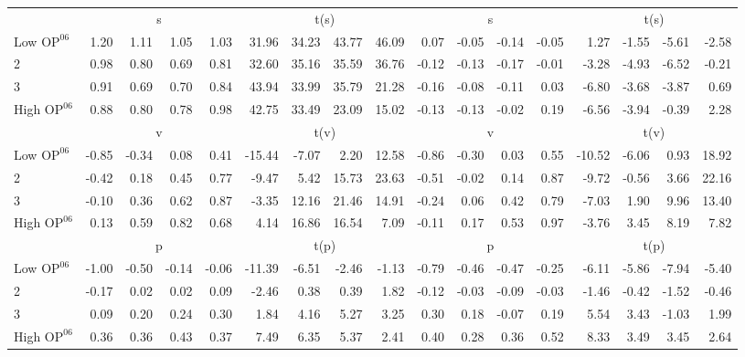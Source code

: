 \begin{table}[!ht]
\begin{tabular}{lrrrrrrrrrrrrrrrr}
  
     & \multicolumn{4}{c}{s} & \multicolumn{4}{c}{t(s)}  & \multicolumn{4}{c}{s} & \multicolumn{4}{c}{t(s)}   \\
     \cmidrule(r){2-5} \cmidrule(r){6-9}  \cmidrule(r){10-13} \cmidrule(r){14-17} 
    Low $\text{OP}^{06}$  & 1.20  & 1.11  & 1.05  & 1.03  & 31.96  & 34.23  & 43.77  & 46.09  & 0.07  & -0.05  & -0.14  & -0.05  & 1.27  & -1.55  & -5.61  & -2.58   \\
    2  & 0.98  & 0.80  & 0.69  & 0.81  & 32.60  & 35.16  & 35.59  & 36.76  & -0.12  & -0.13  & -0.17  & -0.01  & -3.28  & -4.93  & -6.52  & -0.21   \\
    3  & 0.91  & 0.69  & 0.70  & 0.84  & 43.94  & 33.99  & 35.79  & 21.28  & -0.16  & -0.08  & -0.11  & 0.03  & -6.80  & -3.68  & -3.87  & 0.69   \\
    High $\text{OP}^{06}$  & 0.88  & 0.80  & 0.78  & 0.98  & 42.75  & 33.49  & 23.09  & 15.02  & -0.13  & -0.13  & -0.02  & 0.19  & -6.56  & -3.94  & -0.39  & 2.28   \\
    
  
     & \multicolumn{4}{c}{v} & \multicolumn{4}{c}{t(v)}  & \multicolumn{4}{c}{v} & \multicolumn{4}{c}{t(v)}   \\
     \cmidrule(r){2-5} \cmidrule(r){6-9}  \cmidrule(r){10-13} \cmidrule(r){14-17} 
    Low $\text{OP}^{06}$  & -0.85  & -0.34  & 0.08  & 0.41  & -15.44  & -7.07  & 2.20  & 12.58  & -0.86  & -0.30  & 0.03  & 0.55  & -10.52  & -6.06  & 0.93  & 18.92   \\
    2  & -0.42  & 0.18  & 0.45  & 0.77  & -9.47  & 5.42  & 15.73  & 23.63  & -0.51  & -0.02  & 0.14  & 0.87  & -9.72  & -0.56  & 3.66  & 22.16   \\
    3  & -0.10  & 0.36  & 0.62  & 0.87  & -3.35  & 12.16  & 21.46  & 14.91  & -0.24  & 0.06  & 0.42  & 0.79  & -7.03  & 1.90  & 9.96  & 13.40   \\
    High $\text{OP}^{06}$  & 0.13  & 0.59  & 0.82  & 0.68  & 4.14  & 16.86  & 16.54  & 7.09  & -0.11  & 0.17  & 0.53  & 0.97  & -3.76  & 3.45  & 8.19  & 7.82   \\
    
  
     & \multicolumn{4}{c}{p} & \multicolumn{4}{c}{t(p)}  & \multicolumn{4}{c}{p} & \multicolumn{4}{c}{t(p)}   \\
     \cmidrule(r){2-5} \cmidrule(r){6-9}  \cmidrule(r){10-13} \cmidrule(r){14-17} 
    Low $\text{OP}^{06}$  & -1.00  & -0.50  & -0.14  & -0.06  & -11.39  & -6.51  & -2.46  & -1.13  & -0.79  & -0.46  & -0.47  & -0.25  & -6.11  & -5.86  & -7.94  & -5.40   \\
    2  & -0.17  & 0.02  & 0.02  & 0.09  & -2.46  & 0.38  & 0.39  & 1.82  & -0.12  & -0.03  & -0.09  & -0.03  & -1.46  & -0.42  & -1.52  & -0.46   \\
    3  & 0.09  & 0.20  & 0.24  & 0.30  & 1.84  & 4.16  & 5.27  & 3.25  & 0.30  & 0.18  & -0.07  & 0.19  & 5.54  & 3.43  & -1.03  & 1.99   \\
    High $\text{OP}^{06}$  & 0.36  & 0.36  & 0.43  & 0.37  & 7.49  & 6.35  & 5.37  & 2.41  & 0.40  & 0.28  & 0.36  & 0.52  & 8.33  & 3.49  & 3.45  & 2.64   \\
    

\end{tabular}
\end{table}
